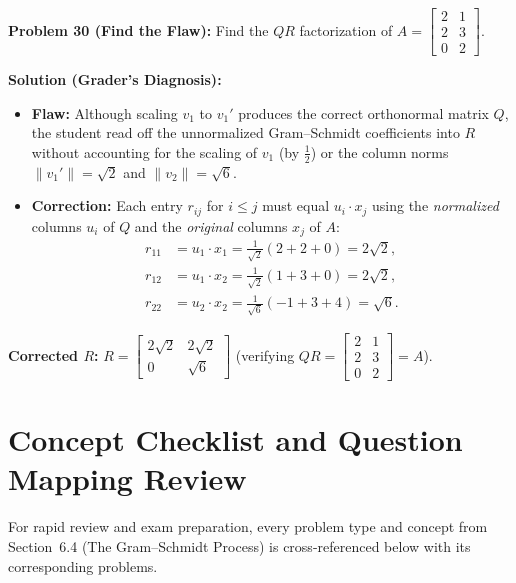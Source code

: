\documentclass[11pt, letterpaper]{article}
\theoremstyle{definition}
\theoremstyle{remark}
\begin{document}
\vspace{0.8em}

\textbf{Problem 30 (Find the Flaw):} Find the $QR$ factorization of $A = \begin{bmatrix} 2 & 1 \\ 2 & 3 \\ 0 & 2 \end{bmatrix}$.

\textbf{Solution (Grader's Diagnosis):}
\begin{itemize}
    \item \textbf{Flaw:} Although scaling $v_1$ to $v_1'$ produces the correct orthonormal matrix $Q$, the student read off the unnormalized Gram--Schmidt coefficients into $R$ without accounting for the scaling of $v_1$ (by $\frac{1}{2}$) or the column norms $\|v_1'\| = \sqrt{2}$ and $\|v_2\| = \sqrt{6}$.
    \item \textbf{Correction:} Each entry $r_{ij}$ for $i \le j$ must equal $u_i \cdot x_j$ using the \emph{normalized} columns $u_i$ of $Q$ and the \emph{original} columns $x_j$ of $A$:
    \begin{align*}
        r_{11} &= u_1 \cdot x_1 = \frac{1}{\sqrt{2}}(2 + 2 + 0) = 2\sqrt{2}, \\
        r_{12} &= u_1 \cdot x_2 = \frac{1}{\sqrt{2}}(1 + 3 + 0) = 2\sqrt{2}, \\
        r_{22} &= u_2 \cdot x_2 = \frac{1}{\sqrt{6}}(-1 + 3 + 4) = \sqrt{6}.
    \end{align*}
\end{itemize}
\textbf{Corrected $R$:} $R = \begin{bmatrix} 2\sqrt{2} & 2\sqrt{2} \\ 0 & \sqrt{6} \end{bmatrix}$ (verifying $QR = \begin{bmatrix} 2 & 1 \\ 2 & 3 \\ 0 & 2 \end{bmatrix} = A$).

\newpage

\section{Concept Checklist and Question Mapping Review}

For rapid review and exam preparation, every problem type and concept from Section~6.4 (The Gram--Schmidt Process) is cross-referenced below with its corresponding problems.
\end{document}
